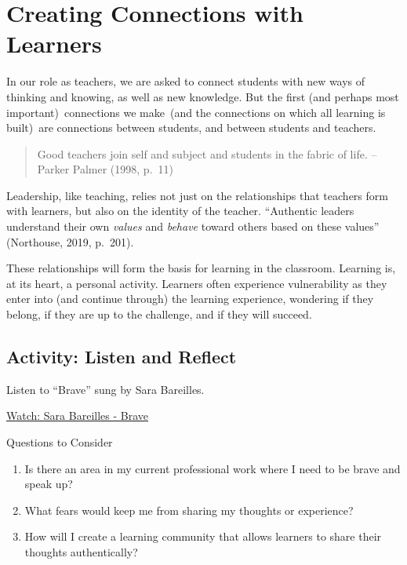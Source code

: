\documentclass[
]{book}
\providecommand{\tightlist}{%
  \setlength{\itemsep}{0pt}\setlength{\parskip}{0pt}}
\begin{document}
\hypertarget{creating-connections-with-learners}{%
\section{Creating Connections with Learners}\label{creating-connections-with-learners}}

In our role as teachers, we are asked to connect students with new ways of thinking and knowing, as well as new knowledge. But the first (and perhaps most important)~connections we make~(and the connections on which all learning is built)~are connections between students, and between students and teachers.

\begin{quote}
Good teachers join self and subject and students in the fabric of life. -- Parker Palmer (1998, p.~11)
\end{quote}

Leadership, like teaching, relies not just on the relationships that teachers form with learners, but also on the identity of the teacher. ``Authentic leaders understand their own \emph{values} and \emph{behave} toward others based on these values'' (Northouse, 2019, p.~201).

These relationships will form the basis for learning in the classroom. Learning is, at its heart, a personal activity. Learners often experience vulnerability as they enter into (and continue through) the learning experience, wondering if they belong, if they are up to the challenge, and if they will succeed.

\hypertarget{activity-listen-and-reflect}{%
\subsection*{Activity: Listen and Reflect}\label{activity-listen-and-reflect}}

\begin{reflect}
Listen to ``Brave'' sung by Sara Bareilles.

\href{https://www.youtube.com/watch?v=QUQsqBqxoR4}{Watch: Sara Bareilles
- Brave}

{Questions to Consider}

\begin{enumerate}
\def\labelenumi{\arabic{enumi}.}
\tightlist
\item
  Is there an area in my current professional work where I need to be
  brave and speak up?\\
\item
  What fears would keep me from sharing my thoughts or experience?\\
\item
  How will I create a learning community that allows learners to share
  their thoughts authentically?
\end{enumerate}
\end{reflect}
\end{document}
